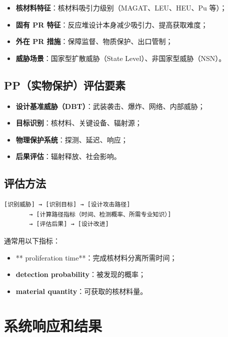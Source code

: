 \documentclass[
  UTF8,
  scheme=plain,
  fontsize=10pt,
  openany
]{ctexbook}
\begin{document}
\begin{itemize}
\tightlist
\item
  \textbf{核材料特征}：核材料吸引力级别（MAGAT、LEU、HEU、Pu 等）；
\item
  \textbf{固有 PR 特征}：反应堆设计本身减少吸引力、提高获取难度；
\item
  \textbf{外在 PR 措施}：保障监督、物质保护、出口管制；
\item
  \textbf{威胁场景}：国家型扩散威胁（State
  Level）、非国家型威胁（NSN）。
\end{itemize}

\subsection{PP（实物保护）评估要素}\label{ppux5b9eux7269ux4fddux62a4ux8bc4ux4f30ux8981ux7d20}

\begin{itemize}
\tightlist
\item
  \textbf{设计基准威胁（DBT）}：武装袭击、爆炸、网络、内部威胁；
\item
  \textbf{目标识别}：核材料、关键设备、辐射源；
\item
  \textbf{物理保护系统}：探测、延迟、响应；
\item
  \textbf{后果评估}：辐射释放、社会影响。
\end{itemize}

\subsection{评估方法}\label{ux8bc4ux4f30ux65b9ux6cd5}

\begin{verbatim}[识别威胁] → [识别目标] → [设计攻击路径] 
       → [计算路径指标（时间、检测概率、所需专业知识）] 
       → [评估后果] → [设计改进]\end{verbatim}

通常用以下指标：

\begin{itemize}
\tightlist
\item
  ** proliferation time**：完成核材料分离所需时间；
\item
  \textbf{detection probability}：被发现的概率；
\item
  \textbf{material quantity}：可获取的核材料量。
\end{itemize}

\section{系统响应和结果}\label{ux7cfbux7edfux54cdux5e94ux548cux7ed3ux679c}
\end{document}
